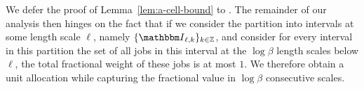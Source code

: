 

We defer the proof of Lemma~\ref{lem:a-cell-bound} to
. The remainder of our analysis then hinges on the fact that if we consider the partition into intervals at some length scale $\ell$, namely $\{\Int_{\ell,k}\}_{k\in\Z}$, and consider for every interval in this partition the set of all jobs in this interval at the $\log \beta$ length scales below $\ell$, the total fractional weight of these jobs is at most $1$. We therefore obtain a unit allocation while capturing the fractional value in $\log\beta$ consecutive scales.

